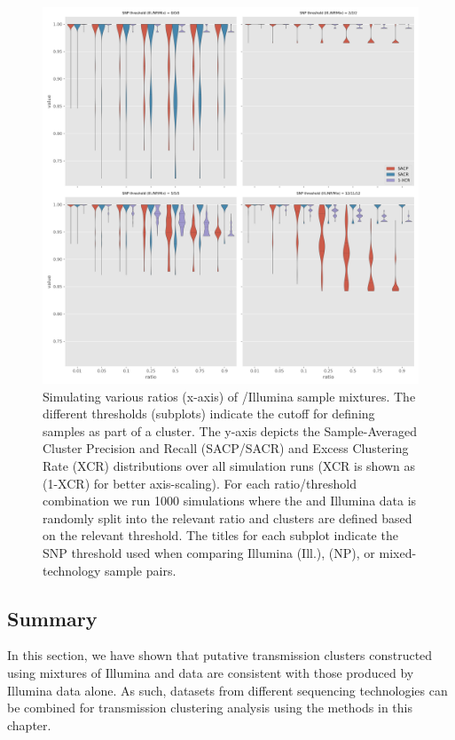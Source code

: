 \begin{figure}
\begin{center}
\includegraphics[width=0.90\columnwidth]{Chapter2/Figs/mixed_simulations.png}
\caption{{Simulating various ratios (x-axis) of \ont{}/Illumina sample mixtures. The different thresholds (subplots) indicate the cutoff for defining samples as part of a cluster. The y-axis depicts the Sample-Averaged Cluster Precision and Recall (SACP/SACR) and Excess Clustering Rate (XCR) distributions over all simulation runs (XCR is shown as (1-XCR) for better axis-scaling). For each ratio/threshold combination we run 1000 simulations where the \ont{} and Illumina data is randomly split into the relevant ratio and clusters are defined based on the relevant threshold. The titles for each subplot indicate the SNP threshold used when comparing Illumina (Ill.), \ont{} (NP), or mixed-technology sample pairs.
{\label{fig:mixed-sims}}%
}}
\end{center}
\end{figure}

\subsection{Summary}

In this section, we have shown that putative transmission clusters constructed using mixtures of Illumina and \ont{} data are consistent with those produced by Illumina data alone. As such, datasets from different sequencing technologies can be combined for transmission clustering analysis using the methods in this chapter.

